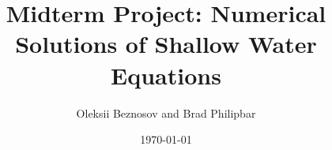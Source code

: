 \documentclass{article}
\title{Midterm Project: Numerical Solutions of Shallow Water Equations}
\author{Oleksii Beznosov and Brad Philipbar}
\date{\today}
\begin{document}
\maketitle
\begin{flushleft}
\newpage



\end{flushleft}
\end{document}
